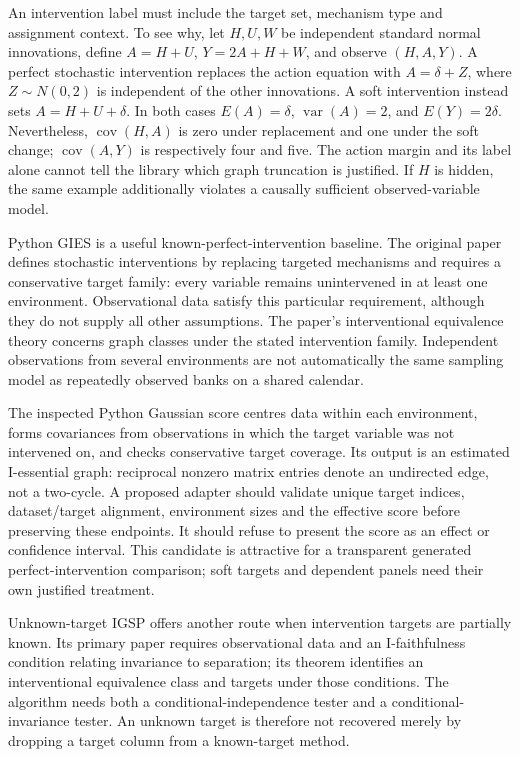 An intervention label must include the target set, mechanism type and
assignment context. To see why, let $H,U,W$ be independent standard
normal innovations, define $A=H+U$, $Y=2A+H+W$, and observe $(H,A,Y)$.
A perfect stochastic
intervention replaces the action equation with $A=\delta+Z$, where
$Z\sim N(0,2)$ is independent of the other innovations. A soft intervention
instead sets $A=H+U+\delta$. In both cases $E(A)=\delta$,
$\operatorname{var}(A)=2$, and $E(Y)=2\delta$. Nevertheless,
$\operatorname{cov}(H,A)$ is zero under replacement and one under the soft
change; $\operatorname{cov}(A,Y)$ is respectively four and five. The action
margin and its label alone cannot tell the library which graph truncation
is justified. If $H$ is hidden, the same example additionally violates a
causally sufficient observed-variable model. \citep{exec14_pt_exact}

Python GIES is a useful known-perfect-intervention baseline. The original
paper defines stochastic interventions by replacing targeted mechanisms
and requires a conservative target family: every variable remains
unintervened in at least one environment. Observational data satisfy this
particular requirement, although they do not supply all other assumptions.
The paper's interventional equivalence theory concerns graph classes under
the stated intervention family. Independent observations from several
environments are not automatically the same sampling model as repeatedly
observed banks on a shared calendar. \citep{exec14_pt_paper_gies}

The inspected Python Gaussian score centres data within each environment,
forms covariances from observations in which the target variable was not
intervened on, and checks conservative target coverage. Its output is an
estimated I-essential graph: reciprocal nonzero matrix entries denote an
undirected edge, not a two-cycle. A proposed adapter should validate unique
target indices, dataset/target alignment, environment sizes and the
effective score before preserving these endpoints. It should refuse to
present the score as an effect or confidence interval. This candidate is
attractive for a transparent generated perfect-intervention comparison;
soft targets and dependent panels need their own justified treatment.
\citep{exec14_pt_gies,exec14_pt_contract}

Unknown-target IGSP offers another route when intervention targets are
partially known. Its primary paper requires observational data and an
I-faithfulness condition relating invariance to separation; its theorem
identifies an interventional equivalence class and targets under those
conditions. The algorithm needs both a conditional-independence tester and
a conditional-invariance tester. An unknown target is therefore not
recovered merely by dropping a target column from a known-target method.
\citep{exec14_pt_paper_utigsp}


